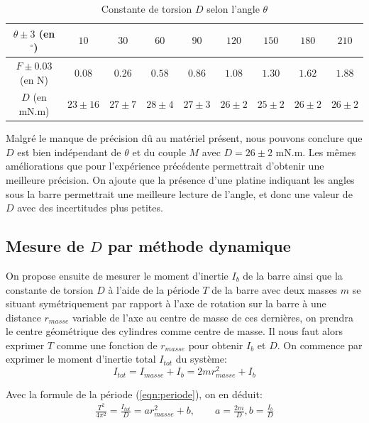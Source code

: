 \documentclass[11pt]{article}
\begin{document}
\begin{table}[h!]
	\centering
	\begin{tabular}{||c | c c c c c c c c||} 
		\hline
		$\theta \pm 3$ (en $^\circ$) & $10$ & $30$ & $60$ & $90$ & $120$ & $150$ & $180$ & $210$ \\
		\hline
        $F \pm 0.03$ (en N) & $0.08$ & $0.26$ & $0.58$ & $0.86$ & $1.08$ & $1.30$ & $1.62$ & $1.88$\\
		\hline
        $D$ (en mN.m) & $23 \pm 16$ & $27 \pm 7$ & $28 \pm 4$ & $27 \pm 3$ & $26 \pm 2$ & $25 \pm 2$ & $26 \pm 2$ & $26 \pm 2$\\
        \hline
    \end{tabular}
	\caption{Constante de torsion $D$ selon l'angle $\theta$}
	\label{table:mesure_D_statique}
\end{table}

Malgré le manque de précision dû au matériel présent, nous pouvons conclure que $D$ est bien indépendant de $\theta$ et du couple $M$ avec $D=26 \pm 2 \text{ mN.m}$. 
Les mêmes améliorations que pour l'expérience précédente permettrait d'obtenir une meilleure précision. 
On ajoute que la présence d'une platine indiquant les angles sous la barre permettrait une meilleure
lecture de l'angle, et donc une valeur de $D$ avec des incertitudes plus petites.


\subsection{Mesure de $D$ par méthode dynamique}
On propose ensuite de mesurer le moment d'inertie $I_b$ de la barre ainsi que la constante de torsion $D$ à l'aide de la période $T$
de la barre avec deux masses $m$ se situant symétriquement par rapport à l'axe de rotation sur la barre à une distance $r_{masse}$ variable de l'axe au centre de masse de ces dernières, on prendra le centre géométrique des cylindres
comme centre de masse. Il nous faut alors exprimer $T$ comme une fonction de $r_{masse}$ pour obtenir 
$I_b$ et $D$. On commence par exprimer le moment d'inertie total $I_{tot}$ du système:
\begin{equation}
    I_{tot} = I_{masse} + I_b = 2mr_{masse}^2 + I_b
\end{equation}

Avec la formule de la période (\ref{eqn:periode}), on en déduit:
\begin{align*}
    \frac{T^2}{4\pi^2} = \frac{I_{tot}}{D} = ar_{masse}^2 + b, \quad \quad a = \frac{2m}{D}, b=\frac{I_b}{D}
\end{align*}
\end{document}
